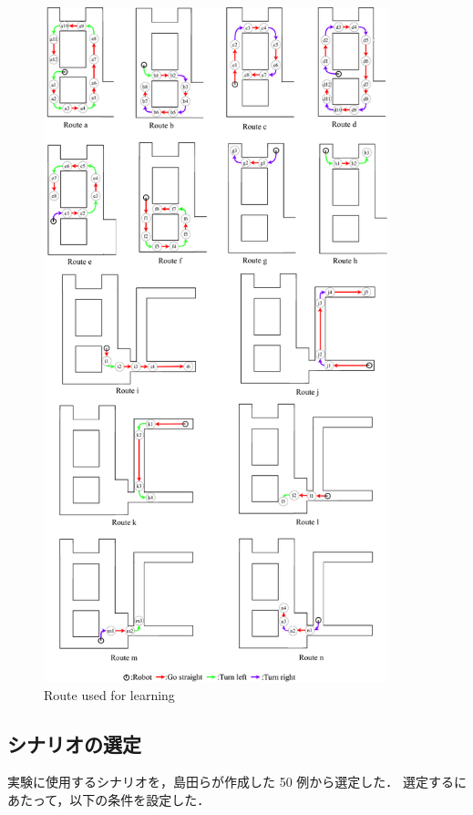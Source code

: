 \begin{figure}[h]
  \centering
  \includegraphics[width=100mm]{images/pdf/ishiguro/route.pdf}
  \caption{Route used for learning}
  \label{fig:route}
\end{figure}

\newpage
\subsection{シナリオの選定}
実験に使用するシナリオを，島田らが作成した 50 例から選定した．
選定するにあたって，以下の条件を設定した．

